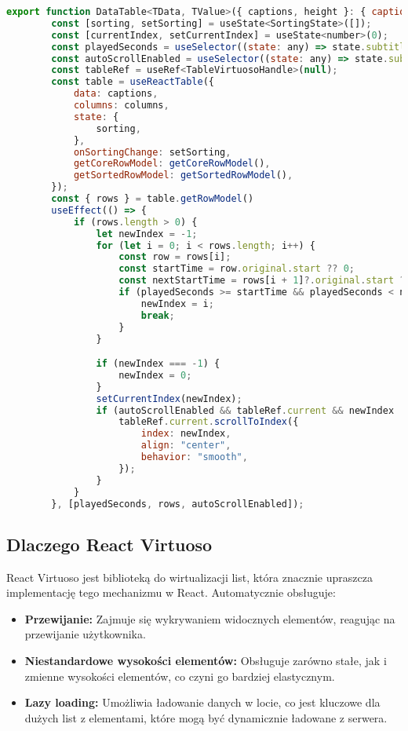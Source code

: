 \begin{lstlisting}[language=JavaScript, caption=Tablica Tanstack do wirtualizacji listy]
    export function DataTable<TData, TValue>({ captions, height }: { captions: Caption[], height: string }) {
        const [sorting, setSorting] = useState<SortingState>([]);
        const [currentIndex, setCurrentIndex] = useState<number>(0);
        const playedSeconds = useSelector((state: any) => state.subtitle.playedSeconds);
        const autoScrollEnabled = useSelector((state: any) => state.subtitle.autoScrollEnabled);
        const tableRef = useRef<TableVirtuosoHandle>(null);
        const table = useReactTable({
            data: captions,
            columns: columns,
            state: {
                sorting,
            },
            onSortingChange: setSorting,
            getCoreRowModel: getCoreRowModel(),
            getSortedRowModel: getSortedRowModel(),
        });
        const { rows } = table.getRowModel()
        useEffect(() => {
            if (rows.length > 0) {
                let newIndex = -1;
                for (let i = 0; i < rows.length; i++) {
                    const row = rows[i];
                    const startTime = row.original.start ?? 0;
                    const nextStartTime = rows[i + 1]?.original.start ?? Infinity;
                    if (playedSeconds >= startTime && playedSeconds < nextStartTime) {
                        newIndex = i;
                        break;
                    }
                }

                if (newIndex === -1) {
                    newIndex = 0;
                }
                setCurrentIndex(newIndex);
                if (autoScrollEnabled && tableRef.current && newIndex !== -1) {
                    tableRef.current.scrollToIndex({
                        index: newIndex,
                        align: "center",
                        behavior: "smooth",
                    });
                }
            }
        }, [playedSeconds, rows, autoScrollEnabled]);
\end{lstlisting}

\subsection*{Dlaczego React Virtuoso}
React Virtuoso jest biblioteką do wirtualizacji list, która znacznie upraszcza implementację tego mechanizmu w React. Automatycznie obsługuje:
\begin{itemize}
    \item \textbf{Przewijanie:} Zajmuje się wykrywaniem widocznych elementów, reagując na przewijanie użytkownika.
    \item \textbf{Niestandardowe wysokości elementów:} Obsługuje zarówno stałe, jak i zmienne wysokości elementów, co czyni go bardziej elastycznym.
    \item \textbf{Lazy loading:} Umożliwia ładowanie danych w locie, co jest kluczowe dla dużych list z elementami, które mogą być dynamicznie ładowane z serwera.
\end{itemize}

